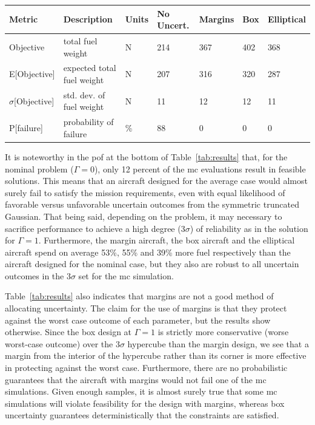 \begin{table}[!h]
\begin{center}
\begin{tabular}{C{2cm} C{3.8cm} C{1.25cm} C{1.6cm} C{1.6cm} C{1.6cm} C{1.6cm}}
\hline
Metric & Description & Units & No Uncert. & Margins & Box & Elliptical \\
\hline
Objective & total fuel weight & $\mathrm{N}$ & 214 & 367 & 402 & 368 \\
E[Objective] & expected total fuel weight & $\mathrm{N}$ & 207 & 316 & 320 & 287 \\
$\sigma$[Objective] & std. dev. of fuel weight & $\mathrm{N}$ & 11 & 12 & 12 & 11 \\
P[failure] & probability of failure & \% & 88 & 0 & 0 & 0\\
\hline
\end{tabular}
\end{center}
\end{table}

It is noteworthy in the \gls{pof} at the bottom of Table~\ref{tab:results} that,
for the nominal problem ($\Gamma = 0$),
only 12 percent of the \gls{mc} evaluations result in feasible solutions.
This means that an aircraft designed for the average case would almost surely
fail to satisfy the mission requirements, even with equal likelihood of favorable versus
unfavorable uncertain outcomes from the symmetric truncated Gaussian.
That being said, depending on the problem, it may necessary to sacrifice
performance to achieve a high degree ($3\sigma$) of
reliability as in the solution for $\Gamma = 1$. Furthermore, the margin aircraft, the box aircraft
and the elliptical aircraft spend on average 53\%, 55\% and 39\% more fuel respectively
than the aircraft designed for the nominal case, but they also are
robust to all uncertain outcomes in the $3\sigma$ set for the \gls{mc} simulation.

Table~\ref{tab:results} also indicates that margins are not a good method of
allocating uncertainty. The claim for the use of margins is that they protect against
the worst case outcome of each parameter, but the results show otherwise.
Since the box design at $\Gamma=1$ is strictly
more conservative (worse worst-case outcome) over the $3\sigma$ hypercube
than the margin design, we see that a margin from the interior of the hypercube
rather than its corner is more effective in protecting against the worst case.
Furthermore, there are no probabilistic
guarantees that the aircraft
with margins would not fail one of the \gls{mc} simulations. Given enough samples,
it is almost surely true that some \gls{mc} simulations will violate feasibility
for the design with margins,
whereas box uncertainty guarantees deterministically that the constraints are satisfied.

